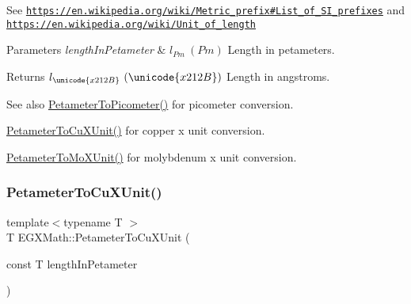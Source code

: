 See \href{https://en.wikipedia.org/wiki/Metric_prefix#List_of_SI_prefixes}{\tt https\+://en.\+wikipedia.\+org/wiki/\+Metric\+\_\+prefix\#\+List\+\_\+of\+\_\+\+S\+I\+\_\+prefixes} and \href{https://en.wikipedia.org/wiki/Unit_of_length}{\tt https\+://en.\+wikipedia.\+org/wiki/\+Unit\+\_\+of\+\_\+length} 
\begin{DoxyParams}{Parameters}
{\em length\+In\+Petameter} & $ l_{Pm}\ (Pm)$ Length in petameters. \\
\hline
\end{DoxyParams}
\begin{DoxyReturn}{Returns}
$ l_{\unicode{x212B}}\ (\unicode{x212B})$ Length in angstroms. 
\end{DoxyReturn}
\begin{DoxySeeAlso}{See also}
\mbox{\hyperlink{group___e_g_x_math-_conversions-_length_conversions-_petameter-_s_i_ga092df775702bdd1b027e20a243d0aa75}{Petameter\+To\+Picometer()}} for picometer conversion. 

\mbox{\hyperlink{group___e_g_x_math-_conversions-_length_conversions-_petameter-_non-_s_i_gad9b37964189c5963e4c634122fd763fe}{Petameter\+To\+Cu\+X\+Unit()}} for copper x unit conversion. 

\mbox{\hyperlink{group___e_g_x_math-_conversions-_length_conversions-_petameter-_non-_s_i_ga29419ba09bb33a7bc9e23f8cde2efea3}{Petameter\+To\+Mo\+X\+Unit()}} for molybdenum x unit conversion. 
\end{DoxySeeAlso}
\mbox{\label{group___e_g_x_math-_conversions-_length_conversions-_petameter-_non-_s_i_gad9b37964189c5963e4c634122fd763fe}} 
\subsubsection{\texorpdfstring{Petameter\+To\+Cu\+X\+Unit()}{PetameterToCuXUnit()}}
{\footnotesize\ttfamily template$<$typename T $>$ \\
T E\+G\+X\+Math\+::\+Petameter\+To\+Cu\+X\+Unit (\begin{DoxyParamCaption}\item[{const T}]{length\+In\+Petameter }\end{DoxyParamCaption})}



